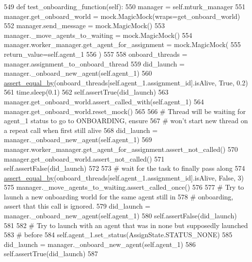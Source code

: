 \begin{DoxyCode}
549     \textcolor{keyword}{def }test\_onboarding\_function(self):
550         manager = self.mturk\_manager
551         manager.get\_onboard\_world = mock.MagicMock(wraps=get\_onboard\_world)
552         manager.send\_message = mock.MagicMock()
553         manager.\_move\_agents\_to\_waiting = mock.MagicMock()
554         manager.worker\_manager.get\_agent\_for\_assignment = mock.MagicMock(
555             return\_value=self.agent\_1
556         )
557 
558         onboard\_threads = manager.assignment\_to\_onboard\_thread
559         did\_launch = manager.\_onboard\_new\_agent(self.agent\_1)
560         \hyperlink{namespaceparlai_1_1mturk_1_1core_1_1test_1_1test__mturk__manager_a1fd7ac4fedefa65d2416601107dbe44c}{assert\_equal\_by}(onboard\_threads[self.agent\_1.assignment\_id].isAlive, \textcolor{keyword}{True}, 0.2)
561         time.sleep(0.1)
562         self.assertTrue(did\_launch)
563         manager.get\_onboard\_world.assert\_called\_with(self.agent\_1)
564         manager.get\_onboard\_world.reset\_mock()
565 
566         \textcolor{comment}{# Thread will be waiting for agent\_1 status to go to ONBOARDING, ensure}
567         \textcolor{comment}{# won't start new thread on a repeat call when first still alive}
568         did\_launch = manager.\_onboard\_new\_agent(self.agent\_1)
569         manager.worker\_manager.get\_agent\_for\_assignment.assert\_not\_called()
570         manager.get\_onboard\_world.assert\_not\_called()
571         self.assertFalse(did\_launch)
572 
573         \textcolor{comment}{# wait for the task to finally pass along}
574         \hyperlink{namespaceparlai_1_1mturk_1_1core_1_1test_1_1test__mturk__manager_a1fd7ac4fedefa65d2416601107dbe44c}{assert\_equal\_by}(onboard\_threads[self.agent\_1.assignment\_id].isAlive, \textcolor{keyword}{False}, 3)
575         manager.\_move\_agents\_to\_waiting.assert\_called\_once()
576 
577         \textcolor{comment}{# Try to launch a new onboarding world for the same agent still in}
578         \textcolor{comment}{# onboarding, assert that this call is ignored.}
579         did\_launch = manager.\_onboard\_new\_agent(self.agent\_1)
580         self.assertFalse(did\_launch)
581 
582         \textcolor{comment}{# Try to launch with an agent that was in none but supposedly launched}
583         \textcolor{comment}{# before}
584         self.agent\_1.set\_status(AssignState.STATUS\_NONE)
585         did\_launch = manager.\_onboard\_new\_agent(self.agent\_1)
586         self.assertTrue(did\_launch)
587 
\end{DoxyCode}
